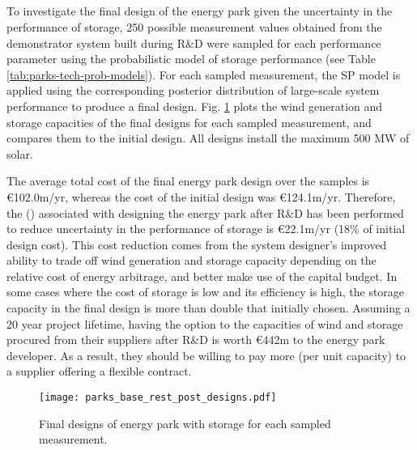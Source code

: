 \subsection{} \label{sec:parks-design-wo-option}

To investigate the final design of the energy park given the uncertainty in the performance of  storage, 250 possible measurement values obtained from the demonstrator system built during R\&D were sampled for each performance parameter using the probabilistic model of storage performance (see Table \ref{tab:parks-tech-prob-models}). %
For each sampled measurement, the SP model is applied using the corresponding posterior distribution of large-scale system performance to produce a final design.
Fig. \ref{fig:parks-restricted-designs} plots the wind generation and  storage capacities of the final designs for each sampled measurement, and compares them to the initial design. All designs install the maximum 500 MW of solar.

The average total cost of the final energy park design over the samples is {\euro}102.0m/yr, whereas the cost of the initial design was {\euro}124.1m/yr. Therefore, the  () associated with designing the energy park after R\&D has been performed to reduce uncertainty in the performance of  storage is {\euro}22.1m/yr (18\% of initial design cost). This cost reduction comes from the system designer's improved ability to trade off wind generation and storage capacity depending on the relative cost of energy arbitrage, and better make use of the capital budget. In some cases where the cost of  storage is low and its efficiency is high, the storage capacity in the final design is more than double that initially chosen. Assuming a 20 year project lifetime, having the option to  the capacities of wind and storage procured from their suppliers after R\&D is worth {\euro}442m to the energy park developer. As a result, they should be willing to pay more (per unit capacity) to a supplier offering a flexible contract.\\

\begin{figure}[h]
    \centering
    \texttt{[image: parks\_base\_rest\_post\_designs.pdf]}
    \caption{Final designs of energy park with  storage for each sampled measurement.}
    \label{fig:parks-restricted-designs}
\end{figure}


